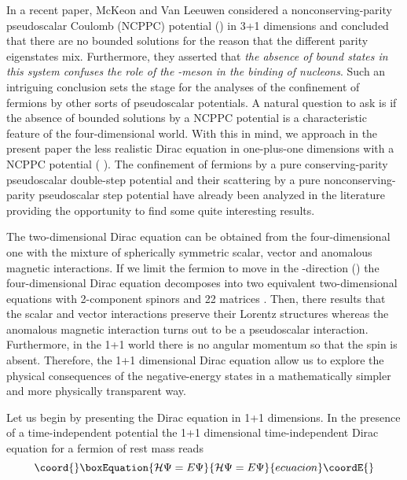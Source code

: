 \documentclass[a4paper,12pt,titlepage]{article}
\begin{document}
In a recent paper, McKeon and Van Leeuwen \cite{mck} considered a
non\-con\-ser\-ving-parity pseu\-do\-sca\-lar Coulomb (NCPPC) potential (\coordHE{}) in 3+1 dimensions and concluded that there are no bounded
solutions for the reason that the different parity eigenstates mix.
Furthermore, they asserted that \textit{the absence of bound states in this
system confuses the role of the }\myHighlight{$\pi $}\coordHE{}\textit{-meson in the binding of
nucleons}. Such an intriguing conclusion sets the stage for the analyses of
the confinement of fermions by other sorts of pseudoscalar potentials. A
natural question to ask is if the absence of bounded solutions by a NCPPC
potential is a characteristic feature of the four-dimensional world. With
this in mind, we approach in the present paper the less realistic Dirac
equation in one-plus-one dimensions with a NCPPC potential (\coordHE{}%
). The confinement of fermions by a pure \-con\-ser\-ving-parity
pseudoscalar double-step potential \cite{asc2} and their scattering by a
pure non\-con\-ser\-ving-parity pseudoscalar step potential \cite{asc3} have
already been analyzed in the literature providing the opportunity to find
some quite interesting results.

The two-dimensional Dirac equation can be obtained from the
four-dimen\-sional one with the mixture of spherically symmetric scalar,
vector and anomalous magnetic interactions. If we limit the fermion to move
in the \coordHE{}-direction (\coordHE{}) the four-dimensional Dirac equation
decomposes into two equivalent two-dimensional equations with 2-component
spinors and 2\myHighlight{$\times $}\coordHE{}2 matrices \cite{str}. Then, there results that the
scalar and vector interactions preserve their Lorentz structures whereas the
anomalous magnetic interaction turns out to be a pseudoscalar interaction.
Furthermore, in the 1+1 world there is no angular momentum so that the spin
is absent. Therefore, the 1+1 dimensional Dirac equation allow us to explore
the physical consequences of the negative-energy states in a mathematically
simpler and more physically transparent way.

Let us begin by presenting the Dirac equation in 1+1 dimensions. In the
presence of a time-independent potential the 1+1 dimensional
time-independent Dirac equation for a fermion of rest mass \coordHE{} reads 
\begin{equation}\coord{}\boxEquation{
\mathcal{H}\Psi =E\Psi  \label{eq1}
}{
\mathcal{H}\Psi =E\Psi  }{ecuacion}\coordE{}\end{equation}
\end{document}
